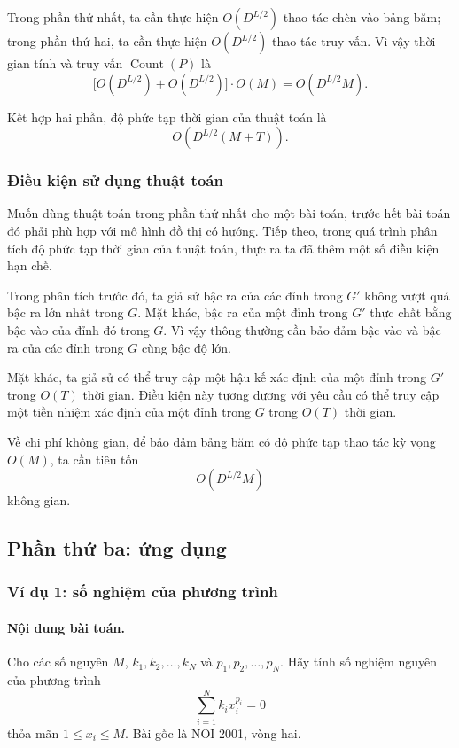 \documentclass[11pt]{article}
\begin{document}
Trong phần thứ nhất, ta cần thực hiện \(O(D^{L/2})\) thao tác chèn vào bảng
băm; trong phần thứ hai, ta cần thực hiện \(O(D^{L/2})\) thao tác truy vấn.
Vì vậy thời gian tính và truy vấn \(\operatorname{Count}(P)\) là
\[
  \bigl[O(D^{L/2})+O(D^{L/2})\bigr]\cdot O(M)
  =O(D^{L/2}M).
\]

Kết hợp hai phần, độ phức tạp thời gian của thuật toán là
\[
  O(D^{L/2}(M+T)).
\]

\subsubsection{Điều kiện sử dụng thuật toán}

Muốn dùng thuật toán trong phần thứ nhất cho một bài toán, trước hết bài toán
đó phải phù hợp với mô hình đồ thị có hướng. Tiếp theo, trong quá trình phân
tích độ phức tạp thời gian của thuật toán, thực ra ta đã thêm một số điều
kiện hạn chế.

Trong phân tích trước đó, ta giả sử bậc ra của các đỉnh trong \(G'\) không
vượt quá bậc ra lớn nhất trong \(G\). Mặt khác, bậc ra của một đỉnh trong
\(G'\) thực chất bằng bậc vào của đỉnh đó trong \(G\). Vì vậy thông thường
cần bảo đảm bậc vào và bậc ra của các đỉnh trong \(G\) cùng bậc độ lớn.

Mặt khác, ta giả sử có thể truy cập một hậu kế xác định của một đỉnh trong
\(G'\) trong \(O(T)\) thời gian. Điều kiện này tương đương với yêu cầu có thể
truy cập một tiền nhiệm xác định của một đỉnh trong \(G\) trong \(O(T)\) thời
gian.

Về chi phí không gian, để bảo đảm bảng băm có độ phức tạp thao tác kỳ vọng
\(O(M)\), ta cần tiêu tốn
\[
  O(D^{L/2}M)
\]
không gian.

\subsection{Phần thứ ba: ứng dụng}

\subsubsection{Ví dụ 1: số nghiệm của phương trình}

\paragraph{Nội dung bài toán.}
Cho các số nguyên \(M\), \(k_1,k_2,\ldots,k_N\) và
\(p_1,p_2,\ldots,p_N\). Hãy tính số nghiệm nguyên của phương trình
\[
  \sum_{i=1}^{N} k_i x_i^{p_i}=0
\]
thỏa mãn \(1\le x_i\le M\). Bài gốc là NOI 2001, vòng hai.
\end{document}
